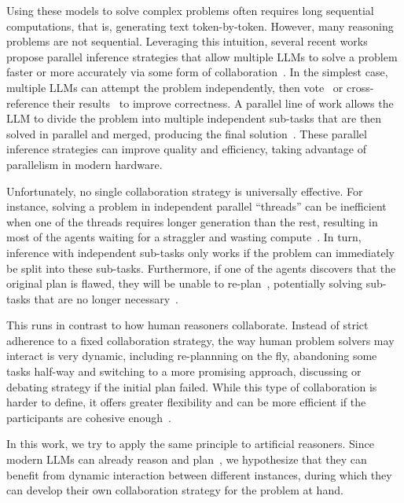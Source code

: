 Using these models to solve complex problems often requires long sequential computations, that is, generating text token-by-token. However, many reasoning problems are not sequential. Leveraging this intuition, several recent works propose parallel inference strategies that allow multiple LLMs to solve a problem faster or more accurately via some form of collaboration~\citep{Wang2022SelfConsistencyIC,ning2024skeletonofthought}.
In the simplest case, multiple LLMs can attempt the problem independently, then vote~\citep{Wang2022SelfConsistencyIC} or cross-reference their results~\citep{du2024improving,wang2024mixture} to improve correctness. A parallel line of work allows the LLM to divide the problem into multiple independent sub-tasks that are then solved in parallel and merged, producing the final solution~\citep{ning2024skeletonofthought, kim2024llm, jin2025learningpromisescalinglanguage}. These parallel inference strategies can improve quality and efficiency, taking advantage of parallelism in modern hardware.

Unfortunately, no single collaboration strategy is universally effective. For instance, solving a problem in independent parallel ``threads'' can be inefficient when one of the threads requires longer generation than the rest, resulting in most of the agents waiting for a straggler and wasting compute~\citep{Wang2022SelfConsistencyIC,wang2024mixture}. In turn, inference with independent sub-tasks only works if the problem can immediately be split into these sub-tasks. Furthermore, if one of the agents discovers that the original plan is flawed, they will be unable to re-plan~\citep{ning2024skeletonofthought,ding2025dynamicparalleltreesearch}, potentially solving sub-tasks that are no longer necessary~\citep{jin2025learningpromisescalinglanguage}.

This runs in contrast to how human reasoners collaborate. Instead of strict adherence to a fixed collaboration strategy, the way human problem solvers may interact is very dynamic, including re-plannning on the fly, abandoning some tasks half-way and switching to a more promising approach, discussing or debating strategy if the initial plan failed. While this type of collaboration is harder to define, it offers greater flexibility and can be more efficient if the participants are cohesive enough~\cite{Hutchins1995, EntinSerfaty1999}.

In this work, we try to apply the same principle to artificial reasoners. Since modern LLMs can already reason and plan~\citep{zhou2024selfdiscover,meta_reasoning_gao2024,wang-etal-2024-meta}, we hypothesize that they can benefit from dynamic interaction between different instances, during which they can develop their own collaboration strategy for the problem at hand.


